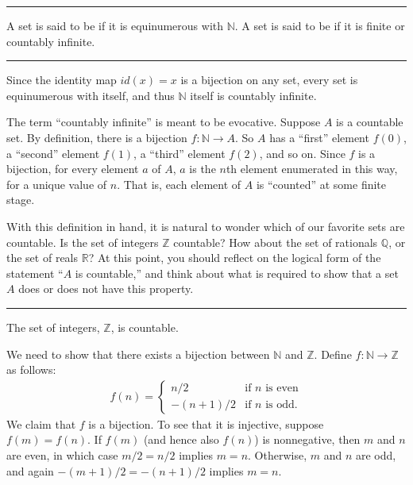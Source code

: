 \documentclass[letterpaper,10pt,english]{sphinxmanual}
\begin{document}
\bigskip\hrule\bigskip


\sphinxAtStartPar
{} A set is said to be  if it is equinumerous with \(\mathbb{N}\). A set is said to be  if it is finite or countably infinite.


\bigskip\hrule\bigskip


\sphinxAtStartPar
Since the identity map \(id(x) = x\) is a bijection on any set, every set is equinumerous with itself, and thus \(\mathbb{N}\) itself is countably infinite.

\sphinxAtStartPar
The term “countably infinite” is meant to be evocative. Suppose \(A\) is a countable set. By definition, there is a bijection \(f : \mathbb{N} \to A\). So \(A\) has a “first” element \(f(0)\), a “second” element \(f(1)\), a “third” element \(f(2)\), and so on. Since \(f\) is a bijection, for every element \(a\) of \(A\), \(a\) is the \(n\)th element enumerated in this way, for a unique value of \(n\). That is, each element of \(A\) is “counted” at some finite stage.

\sphinxAtStartPar
With this definition in hand, it is natural to wonder which of our favorite sets are countable. Is the set of integers \(\mathbb{Z}\) countable? How about the set of rationals \(\mathbb{Q}\), or the set of reals \(\mathbb{R}\)? At this point, you should reflect on the logical form of the statement “\(A\) is countable,” and think about what is required to show that a set \(A\) does or does not have this property.


\bigskip\hrule\bigskip


\sphinxAtStartPar
{} The set of integers, \(\mathbb{Z}\), is countable.

\sphinxAtStartPar
{} We need to show that there exists a bijection between \(\mathbb{N}\) and \(\mathbb{Z}\). Define \(f : \mathbb{N} \to \mathbb{Z}\) as follows:
\begin{equation*}
\begin{split}f(n) = \begin{cases}
         n / 2 & \mbox{if $n$ is even} \\
         -(n + 1) / 2 & \mbox{if $n$ is odd.}
       \end{cases}\end{split}
\end{equation*}
\sphinxAtStartPar
We claim that \(f\) is a bijection. To see that it is injective, suppose \(f(m) = f(n)\). If \(f(m)\) (and hence also \(f(n)\)) is nonnegative, then \(m\) and \(n\) are even, in which case \(m / 2 = n / 2\) implies \(m = n\). Otherwise, \(m\) and \(n\) are odd, and again \(-(m+1) / 2 = -(n+1)/ 2\) implies \(m = n\).
\end{document}
